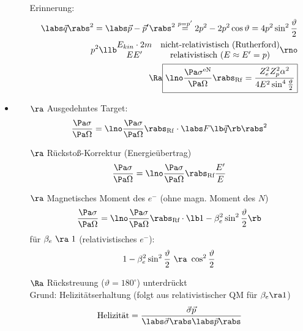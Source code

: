 \begin{itemize}
\begin{itemize}
Erinnerung:
\begin{align}
\labs \vec{q}\rabs ^2 = \labs \vec{p} - \vec{p}^\prime \rabs^2 \overset{p= p^\prime}{=} 2 p^2 - 2p^2 \cos \vartheta = 4 p^2 \sin^2 \frac{\vartheta}{2}\nonumber \\
p^2 \llb \begin{matrix}
E_{kin} \cdot 2m & \text{nicht-relativistisch (Rutherford)}\\ EE^\prime & \text{relativistisch } (E \approx E^\prime = p)
\end{matrix} \rno \nonumber\\
\Ra \boxed{ \lno \frac{\Pa \sigma^\mathrm{eN}}{\Pa \Omega}\rabs _\mathrm{Rf} = \frac{Z_e^2 Z_p^2 \alpha^2 }{4 E^2 \sin^4 \frac{\vartheta}{2}} }
\end{align}
\end{itemize}
\item {}
\begin{itemize}
\item[$\ra$] Ausgedehntes Target:
\begin{align}
\frac{\Pa \sigma}{\Pa \Omega} = \lno \frac{\Pa \sigma}{\Pa \Omega}\rabs_\mathrm{Rf} \cdot \labs F\lb  \vec{q} \rb  \rabs ^2
\end{align}
\item[$\ra$] Rückstoß-Korrektur (Energieübertrag)
\begin{align}
\frac{\Pa \sigma}{\Pa \Omega} = \lno \frac{\Pa \sigma}{\Pa \Omega}\rabs_\text{Rf} \frac{E^\prime}{E}
\end{align}
\item[$\ra$] Magnetisches Moment des $e^-$ (ohne magn. Moment des $N$)
\begin{align}
\frac{\Pa \sigma}{\Pa \Omega} = \lno \frac{\Pa \sigma}{\Pa \Omega}\rabs_\text{Rf} \cdot \lb  1 - \beta_e^2 \sin^2 \frac{\vartheta}{2}\rb 
\end{align}
für $\beta_e \ \ra \ 1$ (relativistisches $e^-$):
\begin{align*}
1-\beta_e^2 \sin^2\frac{\vartheta}{2} \ \ra \ \cos^2 \frac{\vartheta}{2}
\end{align*}
\item[$\Ra$] Rückstreuung ($\vartheta = 180^\circ$) unterdrückt\\
Grund: Helizitätserhaltung (folgt aus relativistischer QM für $\beta_e \ra 1$)
\begin{align*}
\text{Helizität} =  \frac{\vec \sigma \vec{p}}{\labs \vec{\sigma}\rabs \labs \vec{p} \rabs}
\end{align*}
\begin{align}

\end{align}
\end{itemize}
\end{itemize}
